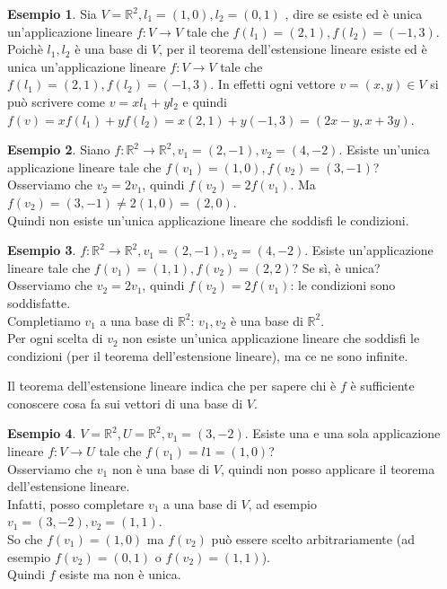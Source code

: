 \documentclass[a4paper]{article}
\theoremstyle{definition}
\newtheorem*{es}{Esempio}
\begin{document}
\begin{es}
	Sia $V = \mathbb{R}^2, l_1 = (1, 0), l_2 = (0, 1)$ , dire se esiste ed è unica un'applicazione lineare $f: V \rightarrow V$ tale che $f(l_1) = (2, 1), f(l_2) = (-1, 3)$. \\
	Poichè $l_1, l_2$ è una base di $V$, per il teorema dell'estensione lineare esiste ed è unica un'applicazione lineare $f: V \rightarrow V$ tale che $f(l_1) = (2, 1), f(l_2) = (-1, 3)$.
	In effetti ogni vettore $v = (x, y) \in V$ si può scrivere come $v = xl_1 + yl_2$ e quindi $f(v) = xf(l_1) + yf(l_2) = x(2, 1) + y(-1, 3) = (2x - y, x + 3y)$.
\end{es}
\begin{es}
	Siano $f: \mathbb{R}^2 \rightarrow \mathbb{R}^2, v_1 = (2, -1), v_2 = (4, -2)$.
	Esiste un'unica applicazione lineare tale che $f(v_1) = (1, 0), f(v_2) = (3, -1)$? \\
	Osserviamo che $v_2 = 2v_1$, quindi $f(v_2) = 2f(v_1)$. Ma $f(v_2) = (3, -1) \neq 2(1, 0) = (2, 0)$. \\
	Quindi non esiste un'unica applicazione lineare che soddisfi le condizioni.
\end{es}
\begin{es}
	$f: \mathbb{R}^2 \rightarrow \mathbb{R}^2, v_1 = (2, -1), v_2 = (4, -2)$.
	Esiste un'applicazione lineare tale che $f(v_1) = (1, 1), f(v_2) = (2, 2)$? Se sì, è unica? \\
	Osserviamo che $v_2 = 2v_1$, quindi $f(v_2) = 2f(v_1)$: le condizioni sono soddisfatte. \\
	Completiamo $v_1$ a una base di $\mathbb{R}^2$: $v_1, v_2$ è una base di $\mathbb{R}^2$. \\
	Per ogni scelta di $v_2$ non esiste un'unica applicazione lineare che soddisfi le condizioni (per il teorema dell'estensione lineare), ma ce ne sono infinite.
\end{es}

Il teorema dell'estensione lineare indica che per sapere chi è $f$ è sufficiente conoscere cosa fa sui vettori di una base di $V$.

\begin{es}
	$V = \mathbb{R}^2, U = \mathbb{R}^2, v_1 = (3, -2)$. Esiste una e una sola applicazione lineare $f: V \rightarrow U$ tale che $f(v_1) = l1 = (1, 0)$? \\
	Osserviamo che $v_1$ non è una base di $V$, quindi non posso applicare il teorema dell'estensione lineare. \\
	Infatti, posso completare $v_1$ a una base di $V$, ad esempio $v_1 = (3, -2), v_2 = (1, 1)$. \\
	So che $f(v_1) = (1, 0)$ ma $f(v_2)$ può essere scelto arbitrariamente (ad esempio $f(v_2) = (0, 1)$ o $f(v_2) = (1, 1)$). \\
	Quindi $f$ esiste ma non è unica.
\end{es}
\end{document}

